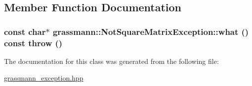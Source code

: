 \subsection{Member Function Documentation}
\hypertarget{classgrassmann_1_1NotSquareMatrixException_2ea102b17f39f32f36dcc315a2ba473c}{
\subsubsection[what]{\setlength{\rightskip}{0pt plus 5cm}const char$\ast$ grassmann::NotSquareMatrixException::what () const  throw ()}}
\label{classgrassmann_1_1NotSquareMatrixException_2ea102b17f39f32f36dcc315a2ba473c}




The documentation for this class was generated from the following file:\begin{CompactItemize}
\item 
\hyperlink{grassmann__exception_8hpp}{grassmann\_\-exception.hpp}\end{CompactItemize}
